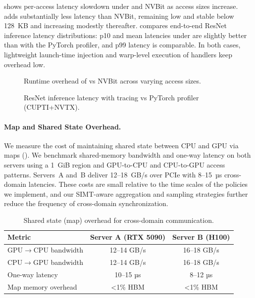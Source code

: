  shows per-access latency slowdown under
\sys and NVBit as access sizes increase. \sys adds substantially less latency
than NVBit, remaining low and stable below 128~KB and increasing modestly
thereafter.  compares end-to-end ResNet inference
latency distributions: p10 and mean latencies under \sys are slightly better
than with the PyTorch profiler, and p99 latency is comparable. In both cases,
lightweight launch-time injection and warp-level execution of \sys handlers
keep overhead low.

\begin{figure}
\centering
{}
\caption{Runtime overhead of \sys vs NVBit across varying access sizes.}
\label{fig:runtime-overhead}
\end{figure}

\begin{figure}
\centering
{}
\caption{ResNet inference latency with \sys tracing vs PyTorch profiler (CUPTI+NVTX).}
\label{fig:resnet-latency}
\end{figure}

\paragraph{Map and Shared State Overhead.}
We measure the cost of maintaining shared state between CPU and GPU via \sys maps (). We benchmark shared-memory bandwidth and one-way latency on both servers using a 1~GiB region and GPU-to-CPU and CPU-to-GPU access patterns. Servers~A and~B deliver 12--18~GB/s over PCIe with 8--15~µs cross-domain latencies. These costs are small relative to the time scales of the policies we implement, and our SIMT-aware aggregation and sampling strategies further reduce the frequency of cross-domain synchronization.

\begin{table}[t]
\centering
\small
\caption{Shared state (map) overhead for cross-domain communication.}
\label{tab:map-overhead}
\begin{tabular}{lcc}
\toprule
\textbf{Metric} & \textbf{Server A (RTX 5090)} & \textbf{Server B (H100)} \\
\midrule
GPU$\rightarrow$CPU bandwidth & 12--14 GB/s & 16--18 GB/s \\
CPU$\rightarrow$GPU bandwidth & 12--14 GB/s & 16--18 GB/s \\
One-way latency & 10--15 µs & 8--12 µs \\
Map memory overhead & <1\% HBM & <1\% HBM \\
\bottomrule
\end{tabular}
\end{table}

